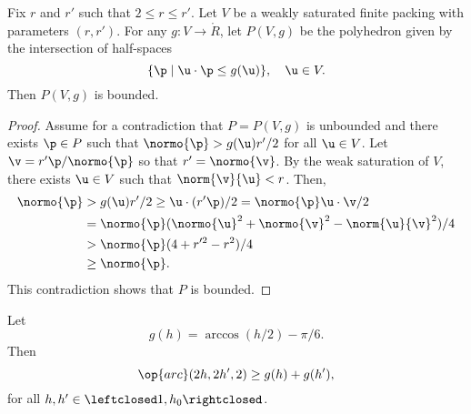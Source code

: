 \begin{lemma}[]\label{lemma:poly-bounded} 
Fix $r$ and $r'$ such that $2\le r\le r'$.
Let $ V$ be a weakly saturated finite packing with parameters $(r,r')$.
For any $g: V\to\ring{R}$, let $P( V,g)$ be the
polyhedron given by the intersection of half-spaces
\[  
\{\p \mid  \u\cdot \p \le g( \u)\},\quad \u\in V.
\] 
Then $P( V,g)$ is bounded.
\end{lemma}
%

\begin{proof} Assume for a contradiction that $P=P( V,g)$ is unbounded
  and there exists $\p\in P$ such that $\normo{\p} > g( \u) r'/2$ for
  all $ \u\in V$.  Let $\v = r' \p/\normo{\p}$ so that
  $r'=\normo{\v}$.  By the weak saturation of $ V$, there exists $
  \u\in V$ such that $\norm{\v}{ \u}<r$.  Then,
\begin{align*} 
\normo{\p} &> g( \u) r'/2 \ge  
\u\cdot (r' \p)/2 = \normo{\p}  \u\cdot \v /2\\
&= \normo{\p} (\normo{ \u}^2 + \normo{\v}^2 - \norm{ \u}{\v}^2)/4\\
&> \normo{\p}(4+r'^2-r^2)/4\\
&\ge \normo{\p}.
\end{align*}
This contradiction shows that $P$ is bounded.
\end{proof}

\begin{lemma}\label{lemma:g-ineq}
Let 
\[ 
g(h) = \arccos(h/2) - \pi/6.
\] 
Then
\begin{equation}\label{eqn:disks} 
\op{arc}(2h,2h',2)\ge g(h) + g(h') ,%
\end{equation}%
for all $h,h'\in\leftclosed 1,h_0\rightclosed$.
\end{lemma}

